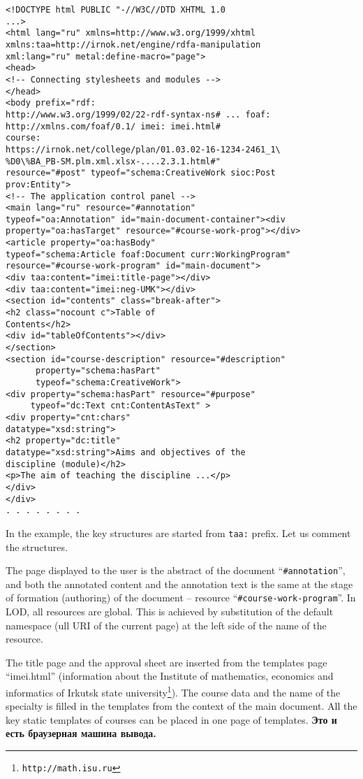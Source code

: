 \documentclass[conference,a4paper]{IEEEtran}
\providecommand\url[1]{\texttt{#1}}
\begin{document}
\begin{verbatim}
<!DOCTYPE html PUBLIC "-//W3C//DTD XHTML 1.0
...>
<html lang="ru" xmlns=http://www.w3.org/1999/xhtml
xmlns:taa=http://irnok.net/engine/rdfa-manipulation
xml:lang="ru" metal:define-macro="page">
<head>
<!-- Connecting stylesheets and modules -->
</head>
<body prefix="rdf:
http://www.w3.org/1999/02/22-rdf-syntax-ns# ... foaf:
http://xmlns.com/foaf/0.1/ imei: imei.html#
course:
https://irnok.net/college/plan/01.03.02-16-1234-2461_1\
%D0\%BA_PB-SM.plm.xml.xlsx-....2.3.1.html#"
resource="#post" typeof="schema:CreativeWork sioc:Post
prov:Entity">
<!-- The application control panel -->
<main lang="ru" resource="#annotation"
typeof="oa:Annotation" id="main-document-container"><div
property="oa:hasTarget" resource="#course-work-prog"></div>
<article property="oa:hasBody"
typeof="schema:Article foaf:Document curr:WorkingProgram"
resource="#course-work-program" id="main-document">
<div taa:content="imei:title-page"></div>
<div taa:content="imei:neg-UMK"></div>
<section id="contents" class="break-after">
<h2 class="nocount c">Table of
Contents</h2>
<div id="tableOfContents"></div>
</section>
<section id="course-description" resource="#description"
      property="schema:hasPart"
      typeof="schema:CreativeWork">
<div property="schema:hasPart" resource="#purpose"
     typeof="dc:Text cnt:ContentAsText" >
<div property="cnt:chars"
datatype="xsd:string">
<h2 property="dc:title"
datatype="xsd:string">Aims and objectives of the
discipline (module)</h2>
<p>The aim of teaching the discipline ...</p>
</div>
</div>
. . . . . . . .
\end{verbatim}

In the example, the key structures are started from \texttt{taa:} prefix. Let us comment the structures.

The page displayed to the user is the abstract of the document ``\texttt{\#annotation}'', and both the annotated content and the annotation text is the same at the stage of formation (authoring) of the document -- resource ``\texttt{\#course-work-program}''.  In LOD, all resources are global.  This is achieved by substitution of the default namespace (ull URI of the current page) at the left side of the name of the resource.

The title page and the approval sheet are inserted from the templates page ``imei.html'' (information about the Institute of mathematics, economics and informatics of Irkutsk state university\footnote{\url{http://math.isu.ru}}).  The course data and the name of the specialty is filled in the templates from the context of the main document.  All the key static templates of courses can be placed in one page of templates. \textbf{Это и есть браузерная машина вывода.}
\end{document}

